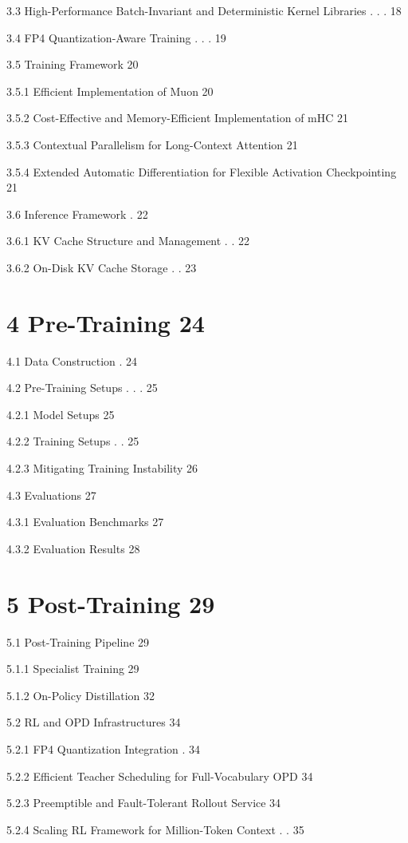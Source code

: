 \documentclass[
  10
]{article}
\begin{document}
3.3 High-Performance Batch-Invariant and Deterministic Kernel Libraries
. . . 18

3.4 FP4 Quantization-Aware Training . . . 19

3.5 Training Framework 20

3.5.1 Efficient Implementation of Muon 20

3.5.2 Cost-Effective and Memory-Efficient Implementation of mHC 21

3.5.3 Contextual Parallelism for Long-Context Attention 21

3.5.4 Extended Automatic Differentiation for Flexible Activation
Checkpointing 21

3.6 Inference Framework . 22

3.6.1 KV Cache Structure and Management . . 22

3.6.2 On-Disk KV Cache Storage . . 23

\section{4 Pre-Training 24}\label{pre-training-24}

4.1 Data Construction . 24

4.2 Pre-Training Setups . . . 25

4.2.1 Model Setups 25

4.2.2 Training Setups . . 25

4.2.3 Mitigating Training Instability 26

4.3 Evaluations 27

4.3.1 Evaluation Benchmarks 27

4.3.2 Evaluation Results 28

\section{5 Post-Training 29}\label{post-training-29}

5.1 Post-Training Pipeline 29

5.1.1 Specialist Training 29

5.1.2 On-Policy Distillation 32

5.2 RL and OPD Infrastructures 34

5.2.1 FP4 Quantization Integration . 34

5.2.2 Efficient Teacher Scheduling for Full-Vocabulary OPD 34

5.2.3 Preemptible and Fault-Tolerant Rollout Service 34

5.2.4 Scaling RL Framework for Million-Token Context . . 35
\end{document}
